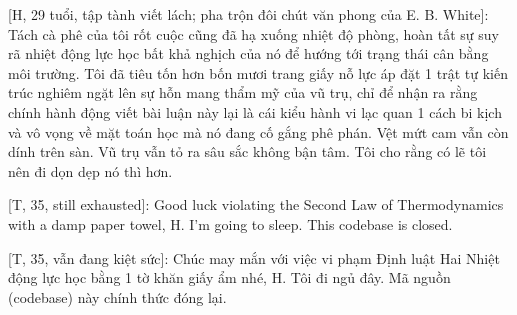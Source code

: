 \documentclass[11pt]{article}
\begin{document}
\textsf{[H, 29 tuổi, tập tành viết lách; pha trộn đôi chút văn phong của E. B. White]:} Tách cà phê của tôi rốt cuộc cũng đã hạ xuống nhiệt độ phòng, hoàn tất sự suy rã nhiệt động lực học bất khả nghịch của nó để hướng tới trạng thái cân bằng môi trường. Tôi đã tiêu tốn hơn bốn mươi trang giấy nỗ lực áp đặt 1 trật tự kiến trúc nghiêm ngặt lên sự hỗn mang thẩm mỹ của vũ trụ, chỉ để nhận ra rằng chính hành động viết bài luận này lại là cái kiểu hành vi lạc quan 1 cách bi kịch và vô vọng về mặt toán học mà nó đang cố gắng phê phán. Vệt mứt cam vẫn còn dính trên sàn. Vũ trụ vẫn tỏ ra sâu sắc không bận tâm. Tôi cho rằng có lẽ tôi nên đi dọn dẹp nó thì hơn.

\vspace{1cm}
\textsf{[T, 35, still exhausted]:} Good luck violating the Second Law of Thermodynamics with a damp paper towel, H. I'm going to sleep. This codebase is closed.

\textsf{[T, 35, vẫn đang kiệt sức]:} Chúc may mắn với việc vi phạm Định luật Hai Nhiệt động lực học bằng 1 tờ khăn giấy ẩm nhé, H. Tôi đi ngủ đây. Mã nguồn (codebase) này chính thức đóng lại.



\printbibliography[heading=bibintoc]
	
\end{document}
